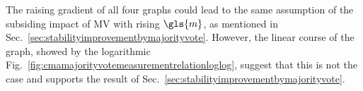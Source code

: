 The raising gradient of all four graphs could lead to the same assumption of the subsiding impact of \ac{MV} with rising $\gls{m}$, as mentioned in Sec.\ \ref{sec:stabilityimprovementbymajorityvote}.
However, the linear course of the graph, showed by the logarithmic Fig.\ \ref{fig:cmamajorityvotemeasurementrelationloglog}, suggest that this is not the case and supports the result of Sec.\ \ref{sec:stabilityimprovementbymajorityvote}.


